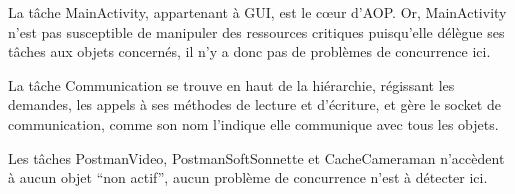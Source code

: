   La tâche MainActivity, appartenant à GUI, est le cœur d'AOP. 
  Or, MainActivity n’est pas susceptible de manipuler des ressources critiques puisqu'elle délègue ses tâches aux objets concernés, il n’y a donc pas de problèmes de concurrence ici.
  
  La tâche Communication se trouve en haut de la hiérarchie, régissant les demandes, les appels à ses méthodes de lecture et d’écriture, et gère le socket de communication, comme son nom l’indique elle communique avec tous les objets.
    
  Les tâches PostmanVideo, PostmanSoftSonnette et CacheCameraman n’accèdent à aucun objet “non actif”, aucun problème de concurrence n’est à détecter ici.
  
